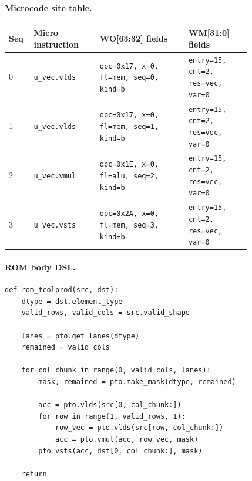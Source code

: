 \paragraph{Microcode site table.}
{\scriptsize
\begin{longtable}{@{}R{0.055\linewidth}L{0.23\linewidth}L{0.31\linewidth}L{0.22\linewidth}@{}}
\toprule
Seq & Micro instruction & WO[63:32] fields & WM[31:0] fields \\
 & \texttt{u\_vec.vlds} & \texttt{opc=0x17, x=0, fl=mem, seq=0, kind=b} & \texttt{entry=15, cnt=2, res=vec, var=0} \\
1 & \texttt{u\_vec.vlds} & \texttt{opc=0x17, x=0, fl=mem, seq=1, kind=b} & \texttt{entry=15, cnt=2, res=vec, var=0} \\
2 & \texttt{u\_vec.vmul} & \texttt{opc=0x1E, x=0, fl=alu, seq=2, kind=b} & \texttt{entry=15, cnt=2, res=vec, var=0} \\
3 & \texttt{u\_vec.vsts} & \texttt{opc=0x2A, x=0, fl=mem, seq=3, kind=b} & \texttt{entry=15, cnt=2, res=vec, var=0} \\
\bottomrule
\end{longtable}
}
\paragraph{ROM body DSL.}
\begin{lstlisting}[style=ptocode]
def rom_tcolprod(src, dst):
    dtype = dst.element_type
    valid_rows, valid_cols = src.valid_shape

    lanes = pto.get_lanes(dtype)
    remained = valid_cols

    for col_chunk in range(0, valid_cols, lanes):
        mask, remained = pto.make_mask(dtype, remained)

        acc = pto.vlds(src[0, col_chunk:])
        for row in range(1, valid_rows, 1):
            row_vec = pto.vlds(src[row, col_chunk:])
            acc = pto.vmul(acc, row_vec, mask)
        pto.vsts(acc, dst[0, col_chunk:], mask)

    return
\end{lstlisting}
\Needspace{0.34\textheight}
